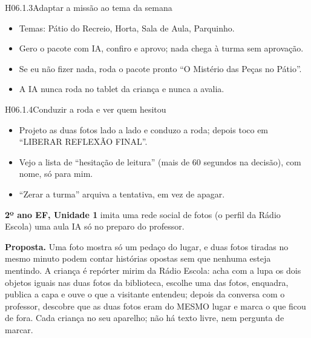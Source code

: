 \begin{historia}{H06.1.3}{Adaptar a missão ao tema da semana}{\pronto}
\aceite
\begin{itemize}
  \item Temas: Pátio do Recreio, Horta, Sala de Aula, Parquinho.
  \item Gero o pacote com IA, confiro e aprovo; nada chega à turma sem
    aprovação.
  \item Se eu não fizer nada, roda o pacote pronto \enquote{O Mistério das
    Peças no Pátio}.
  \item A IA nunca roda no tablet da criança e nunca a avalia.
\end{itemize}
\end{historia}

\begin{historia}{H06.1.4}{Conduzir a roda e ver quem hesitou}{\pronto}
\aceite
\begin{itemize}
  \item Projeto as duas fotos lado a lado e conduzo a roda; depois toco em
    \enquote{LIBERAR REFLEXÃO FINAL}.
  \item Vejo a lista de \enquote{hesitação de leitura} (mais de 60 segundos na
    decisão), com nome, só para mim.
  \item \enquote{Zerar a turma} arquiva a tentativa, em vez de apagar.
\end{itemize}
\end{historia}


\textbf{2º ano EF, Unidade 1} \textperiodcentered{} imita uma rede social de
fotos (o perfil da Rádio Escola) \textperiodcentered{} uma aula
\textperiodcentered{} IA só no preparo do professor.

\textbf{Proposta.} Uma foto mostra só um pedaço do lugar, e duas fotos tiradas
no mesmo minuto podem contar histórias opostas sem que nenhuma esteja
mentindo. A criança é repórter mirim da Rádio Escola: acha com a lupa os dois
objetos iguais nas duas fotos da biblioteca, escolhe uma das fotos, enquadra, publica a
capa e ouve o que a visitante entendeu; depois da conversa com o professor,
descobre que as duas fotos eram do MESMO lugar e marca o que ficou de fora.
Cada criança no seu aparelho; não há texto livre, nem pergunta de marcar.

